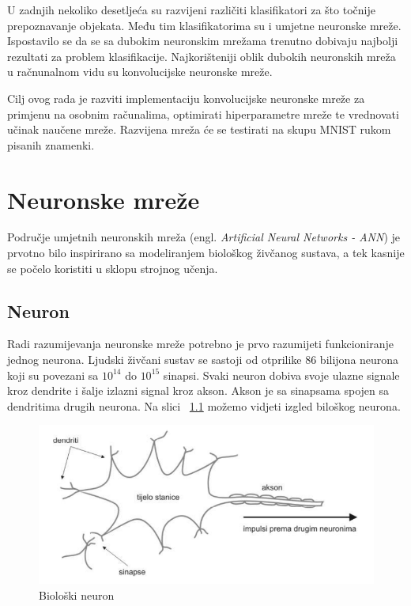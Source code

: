 \documentclass[times, utf8, zavrsni, numeric]{fer}
\begin{document}
U zadnjih nekoliko desetljeća su razvijeni različiti klasifikatori za što točnije prepoznavanje objekata. Među tim klasifikatorima su i umjetne neuronske mreže. Ispostavilo se da se sa dubokim neuronskim mrežama trenutno dobivaju najbolji rezultati za problem klasifikacije. Najkorišteniji oblik dubokih neuronskih mreža u račnunalnom vidu su konvolucijske neuronske mreže.

Cilj ovog rada je razviti implementaciju konvolucijske neuronske mreže za primjenu na osobnim računalima, optimirati hiperparametre mreže te vrednovati učinak naučene mreže. Razvijena mreža će se testirati na skupu MNIST rukom pisanih znamenki.
\chapter{Neuronske mreže}
Područje umjetnih neuronskih mreža (engl. \textit{Artificial Neural Networks - ANN}) je prvotno bilo inspirirano sa modeliranjem biološkog živčanog sustava, a tek kasnije se počelo koristiti u sklopu strojnog učenja. 
\section{Neuron}
Radi razumijevanja neuronske mreže potrebno je prvo razumijeti funkcioniranje jednog neurona. Ljudski živčani sustav se sastoji od otprilike 86 bilijona neurona koji su povezani sa $10^{14}$ do $10^{15}$ sinapsi. Svaki neuron dobiva svoje ulazne signale kroz dendrite i šalje izlazni signal kroz akson. Akson je sa sinapsama spojen sa dendritima drugih neurona. Na slici ~\ref{fig:bio-neuron} možemo vidjeti izgled biloškog neurona.
\begin{figure}
    \centering
    \includegraphics[width=12cm]{img/bio-neuron.png}
    \caption{Biološki neuron}
    \label{fig:bio-neuron}
\end{figure}
\end{document}
